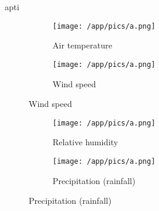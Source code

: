 apti     \documentclass[10pt,a4paper,UTF8]{article}
\begin{document}
{\begin{figure}[H]
\begin{minipage}[t]{0.48\textwidth}
\begin{figure}[H]
    \end{figure}
    \end{minipage}
    \hfill
\end{figure}%
\begin{figure}[H]  %
    \begin{minipage}[t]{0.48\textwidth}
    \centering
    \begin{figure}[H]
    \vspace*{-5mm}
    \caption{ Air temperature }
    \texttt{[image: /app/pics/a.png]}
    \end{figure}
    \end{minipage}
    \hfill
\centering
    \begin{minipage}[t]{0.48\textwidth}
    \centering
    \begin{figure}[H]
    \vspace*{-5mm}
    \caption{ Wind speed }
    \texttt{[image: /app/pics/a.png]}
    \end{figure}
    \end{minipage}
    \hfill
\end{figure}%
\begin{figure}[H]  %
    \begin{minipage}[t]{0.48\textwidth}
    \centering
    \begin{figure}[H]
    \vspace*{-5mm}
    \caption{ Relative humidity }
    \texttt{[image: /app/pics/a.png]}
    \end{figure}
    \end{minipage}
    \hfill
\centering
    \begin{minipage}[t]{0.48\textwidth}
    \centering
    \begin{figure}[H]
    \vspace*{-5mm}
    \caption{ Precipitation (rainfall) }
    \texttt{[image: /app/pics/a.png]}
    \end{figure}

\end{minipage}
\end{figure}}
\end{document}
